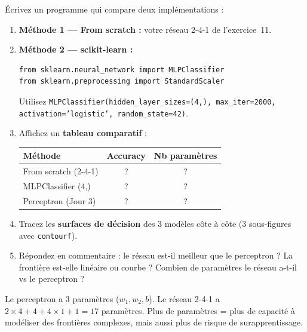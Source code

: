 
\'{E}crivez un programme qui compare deux impl\'{e}mentations :

\begin{enumerate}[label=\alph*)]
    \item \textbf{M\'{e}thode 1 --- From scratch :} votre r\'{e}seau 2-4-1 de l'exercice~11.

    \item \textbf{M\'{e}thode 2 --- scikit-learn :}
    \begin{verbatim}
from sklearn.neural_network import MLPClassifier
from sklearn.preprocessing import StandardScaler
    \end{verbatim}
    Utilisez \texttt{MLPClassifier(hidden\_layer\_sizes=(4,),
    max\_iter=2000, activation='logistic', random\_state=42)}.

    \item Affichez un \textbf{tableau comparatif} :
    \begin{center}
    \renewcommand{\arraystretch}{1.2}
    \begin{tabular}{l|c|c}
        \toprule
        \textbf{M\'{e}thode} & \textbf{Accuracy} & \textbf{Nb param\`{e}tres} \\
        \midrule
        From scratch (2-4-1) & ? & ? \\
        MLPClassifier (4,) & ? & ? \\
        Perceptron (Jour 3) & ? & ? \\
        \bottomrule
    \end{tabular}
    \end{center}

    \item Tracez les \textbf{surfaces de d\'{e}cision} des 3 mod\`{e}les c\^{o}te \`{a} c\^{o}te
        (3 sous-figures avec \texttt{contourf}).

    \item R\'{e}pondez en commentaire : le r\'{e}seau est-il meilleur que le perceptron ?
        La fronti\`{e}re est-elle lin\'{e}aire ou courbe ? Combien de param\`{e}tres le
        r\'{e}seau a-t-il vs le perceptron ?
\end{enumerate}

\begin{intuitionbox}[Indice]
    Le perceptron a 3 param\`{e}tres ($w_1, w_2, b$). Le r\'{e}seau 2-4-1 a
    $2 \times 4 + 4 + 4 \times 1 + 1 = 17$ param\`{e}tres. Plus de param\`{e}tres
    = plus de capacit\'{e} \`{a} mod\'{e}liser des fronti\`{e}res complexes, mais aussi
    plus de risque de surapprentissage.
\end{intuitionbox}

